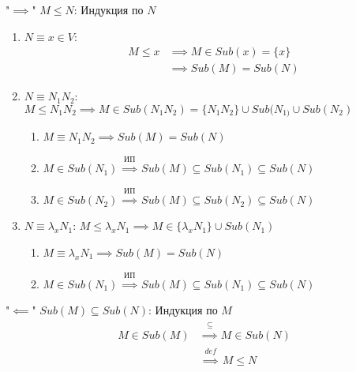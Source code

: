 \documentclass{article}
\newcommand{\overinfo}[2]{
    \stackrel{\substack{#1}}{#2}
}
\begin{document}
"\(\implies\)" \(M \leq N\): Индукция по \(N\)
\begin{enumerate}
    \item \(N \equiv x \in V\):
        \begin{align*}
            M \leq x &\implies M \in Sub\left(x\right) = \{x\} \\
            &\implies Sub\left(M\right) = Sub\left(N\right)
        \end{align*}
    \item \(N \equiv N_{1}N_{2}\):
        \(M \leq N_{1}N_{2} \implies M \in Sub(N_{1}N_{2}) = \{N_{1}N_{2}\} \cup Sub(N_{1)} \cup Sub(N_{2})\)
        \begin{enumerate}
            \item \(M \equiv N_{1}N_{2} \implies Sub\left(M\right) = Sub\left(N\right)\)
            \item \(M \in Sub(N_{1}) \overinfo{ИП}{\implies} Sub\left(M\right) \subseteq Sub(N_{1}) \subseteq Sub\left(N\right)\)
            \item \(M \in Sub(N_{2}) \overinfo{ИП}{\implies} Sub\left(M\right) \subseteq Sub(N_{2}) \subseteq Sub\left(N\right)\)
        \end{enumerate}
    \item \(N \equiv \lambda_{x}N_{1}\):
        \(M \leq \lambda_{x}N_{1} \implies M \in \{\lambda_{x}N_{1}\} \cup Sub(N_{1})\)
        \begin{enumerate}
            \item \(M \equiv \lambda_{x}N_{1} \implies Sub\left(M\right) = Sub\left(N\right)\)
            \item \(M \in Sub(N_{1}) \overinfo{ИП}{\implies} Sub\left(M\right) \subseteq Sub(N_{1}) \subseteq Sub\left(N\right)\)
        \end{enumerate}
\end{enumerate}

"\(\impliedby\)" \(Sub\left(M\right) \subseteq Sub\left(N\right)\): Индукция по \(M\)
\begin{align*}
    M \in Sub\left(M\right) &\overinfo{\subseteq}{\implies} M \in Sub\left(N\right) \\
    &\overinfo{def}{\implies} M \leq N
\end{align*}
\end{document}
